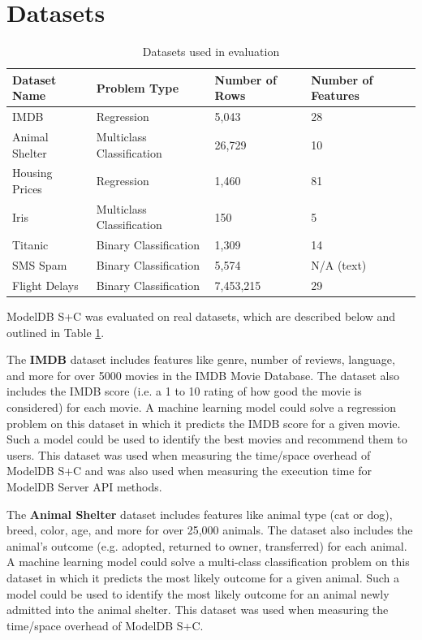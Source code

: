 \section{Datasets}
 \begin{table}
   \centering
    \begin{tabular}{ | l | l | l | l |}
      \hline
      Dataset Name & Problem Type & Number of Rows & Number of Features \\ \hline
      IMDB & Regression & 5,043 & 28 \\ \hline
      Animal Shelter & Multiclass Classification & 26,729 & 10 \\ \hline
      Housing Prices & Regression & 1,460 & 81 \\ \hline
      Iris & Multiclass Classification & 150 & 5 \\  \hline
      Titanic & Binary Classification & 1,309 & 14  \\  \hline
      SMS Spam & Binary Classification & 5,574 & N/A (text) \\  \hline
      Flight Delays & Binary Classification & 7,453,215 & 29 \\ 
      \hline
   \end{tabular}
   \caption{Datasets used in evaluation}
   \label{tab:datasets}
 \end{table}

ModelDB S+C was evaluated on real datasets, which are described below and outlined
in Table \ref{tab:datasets}.

The \textbf{IMDB} dataset \cite{imdb} includes features like genre, number of
reviews, language, and more for over 5000 movies in the IMDB Movie Database. The dataset
also includes the IMDB score (i.e. a 1 to 10 rating of how good the movie is considered)
for each movie. A machine learning model could solve a regression problem on this
dataset in which it predicts the IMDB score for a given movie. Such a model could
be used to identify the best movies and recommend them to users. This dataset
was used when measuring the time/space overhead of ModelDB S+C and was also used
when measuring the execution time for ModelDB Server API methods.

The \textbf{Animal Shelter} dataset \cite{animal} includes features like
animal type (cat or dog), breed, color, age, and more for over 25,000 animals. The
dataset also includes the animal's outcome (e.g. adopted, returned to owner, transferred)
for each animal. A machine learning model could solve a multi-class classification problem on this dataset
in which it predicts the most likely outcome for a given animal. Such a model could 
be used to identify the most likely outcome for an animal newly admitted into the
animal shelter. This dataset was used when measuring the time/space overhead
of ModelDB S+C.

